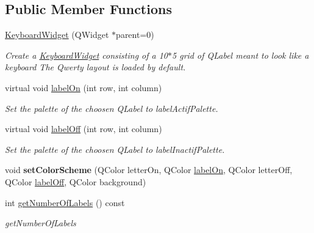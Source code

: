 \subsection*{Public Member Functions}
\begin{DoxyCompactItemize}
\item 
\hyperlink{class_keyboard_widget_ac14f6e0d625237b1e5a34938081fd333}{Keyboard\-Widget} (Q\-Widget $\ast$parent=0)
\begin{DoxyCompactList}\small\item\em Create a \hyperlink{class_keyboard_widget}{Keyboard\-Widget} consisting of a 10$\ast$5 grid of Q\-Label meant to look like a keyboard The Qwerty layout is loaded by default. \end{DoxyCompactList}\item 
virtual void \hyperlink{class_keyboard_widget_aec29dc2f1059798655b028c3c677112a}{label\-On} (int row, int column)
\begin{DoxyCompactList}\small\item\em Set the palette of the choosen Q\-Label to label\-Actif\-Palette. \end{DoxyCompactList}\item 
virtual void \hyperlink{class_keyboard_widget_a20598fb8ae364d5fce74f4299a2d3146}{label\-Off} (int row, int column)
\begin{DoxyCompactList}\small\item\em Set the palette of the choosen Q\-Label to label\-Inactif\-Palette. \end{DoxyCompactList}\item 
\hypertarget{class_keyboard_widget_a06dd2114d263d985e9bb12222d53eea2}{void {\bfseries set\-Color\-Scheme} (Q\-Color letter\-On, Q\-Color \hyperlink{class_keyboard_widget_aec29dc2f1059798655b028c3c677112a}{label\-On}, Q\-Color letter\-Off, Q\-Color \hyperlink{class_keyboard_widget_a20598fb8ae364d5fce74f4299a2d3146}{label\-Off}, Q\-Color background)}\label{class_keyboard_widget_a06dd2114d263d985e9bb12222d53eea2}

\item 
int \hyperlink{class_keyboard_widget_a35b569560ea90337c46ceacfe00d5da6}{get\-Number\-Of\-Labels} () const 
\begin{DoxyCompactList}\small\item\em get\-Number\-Of\-Labels \end{DoxyCompactList}\end{DoxyCompactItemize}
